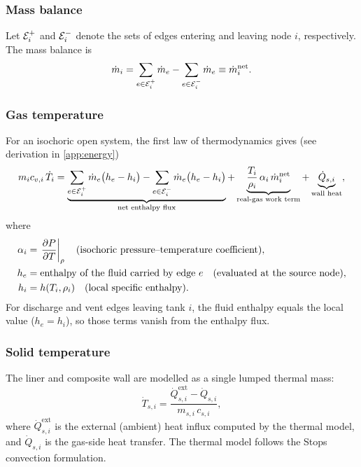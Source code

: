 \subsubsection{Mass balance}

Let $\mathcal{E}_i^+$ and $\mathcal{E}_i^-$ denote the sets of edges entering and leaving
node $i$, respectively.  The mass balance is
\begin{equation}
  \dot{m}_i = \sum_{e \in \mathcal{E}_i^+} \dot{m}_e - \sum_{e \in \mathcal{E}_i^-} \dot{m}_e
            \equiv \dot{m}_i^{\text{net}}.
  \label{eq:mass-balance}
\end{equation}

\subsubsection{Gas temperature}

For an isochoric open system, the first law of thermodynamics gives (see
derivation in \cref{app:energy})
\begin{equation}
  m_i c_{v,i}\, \dot{T}_i =
    \underbrace{\sum_{e \in \mathcal{E}_i^+} \dot{m}_e \bigl(h_e - h_i\bigr)
      - \sum_{e \in \mathcal{E}_i^-} \dot{m}_e \bigl(h_e - h_i\bigr)}_{\text{net enthalpy flux}}
    + \underbrace{\frac{T_i}{\rho_i}\,\alpha_i\,\dot{m}_i^{\text{net}}}_{\text{real-gas work term}}
    + \underbrace{\dot{Q}_{s,i}}_{\text{wall heat}},
  \label{eq:energy-balance}
\end{equation}
where
\begin{align}
  \alpha_i &= \left.\frac{\partial P}{\partial T}\right|_{\rho}
    \quad \text{(isochoric pressure--temperature coefficient)}, \\
  h_e      &= \text{enthalpy of the fluid carried by edge } e
    \quad \text{(evaluated at the source node)}, \\
  h_i      &= h(T_i, \rho_i)
    \quad \text{(local specific enthalpy)}.
\end{align}
For discharge and vent edges leaving tank $i$, the fluid enthalpy equals the
local value ($h_e = h_i$), so those terms vanish from the enthalpy flux.

\subsubsection{Solid temperature}

The liner and composite wall are modelled as a single lumped thermal mass:
\begin{equation}
  \dot{T}_{s,i} = \frac{\dot{Q}_{s,i}^{\text{ext}} - \dot{Q}_{s,i}}{m_{s,i}\,c_{s,i}},
  \label{eq:solid-temp}
\end{equation}
where $\dot{Q}_{s,i}^{\text{ext}}$ is the external (ambient) heat influx computed
by the thermal model, and $\dot{Q}_{s,i}$ is the gas-side heat transfer.  The
thermal model follows the Stops convection formulation.

